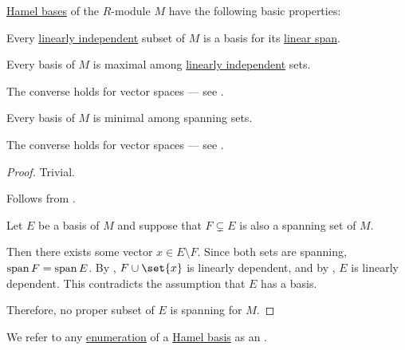\begin{proposition}\label{thm:def:hamel_basis}
  \hyperref[def:hamel_basis]{Hamel bases} of the \( R \)-module \( M \) have the following basic properties:
  \begin{thmenum}
     Every \hyperref[def:linear_dependence]{linearly independent} subset of \( M \) is a basis for its \hyperref[def:semimodule/submodel]{linear span}.

     Every basis of \( M \) is maximal among \hyperref[thm:def:linear_dependence]{linearly independent} sets.

    The converse holds for vector spaces --- see .

     Every basis of \( M \) is minimal among spanning sets.

    The converse holds for vector spaces --- see .
  \end{thmenum}
\end{proposition}
\begin{proof}
   Trivial.

   Follows from .

   Let \( E \) be a basis of \( M \) and suppose that \( F \subsetneq E \) is also a spanning set of \( M \).

  Then there exists some vector \( x \in E \setminus F \). Since both sets are spanning, \( \operatorname{span} F = \operatorname{span} E \). By , \( F \cup \set{ x } \) is linearly dependent, and by , \( E \) is linearly dependent. This contradicts the assumption that \( E \) has a basis.

  Therefore, no proper subset of \( E \) is spanning for \( M \).
\end{proof}

\begin{definition}\label{def:ordered_hamel_basis}
  We refer to any  \hyperref[def:enumeration]{enumeration} of a \hyperref[def:hamel_basis]{Hamel basis} as an .
\end{definition}

